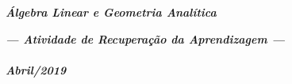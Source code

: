 \documentclass[pdftex, brazil, 12pt, oneside, addpoints]{exam}
\begin{document}
\begin{coverpages}

\begin{center}
\textbf{\textit{\Large%
Álgebra Linear e Geometria Analítica}}
\end{center}

\vspace{1cm}

\begin{figure}[H]
\begin{center}
\end{center}
\end{figure}

\vspace{1cm}

\begin{center}
\textit{\textbf{\Large%
--- Atividade de Recuperação da Aprendizagem ---\\%
\ \\%
Abril/2019}}
\end{center}



\end{coverpages}
\end{document}
